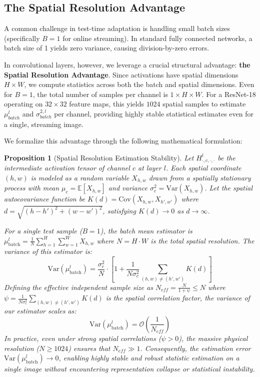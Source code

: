 \documentclass{article}
\theoremstyle{plain}
\newtheorem{proposition}[theorem]{Proposition}
\theoremstyle{definition}
\theoremstyle{remark}
\begin{document}
\subsection{The Spatial Resolution Advantage}
A common challenge in test-time adaptation is handling small batch sizes (specifically $B=1$ for online streaming). In standard fully connected networks, a batch size of 1 yields zero variance, causing division-by-zero errors.

In convolutional layers, however, we leverage a crucial structural advantage: \textbf{the Spatial Resolution Advantage}. Since activations have spatial dimensions $H \times W$, we compute statistics across both the batch and spatial dimensions. Even for $B=1$, the total number of samples per channel is $1 \times H \times W$. For a ResNet-18 operating on $32 \times 32$ feature maps, this yields $1024$ spatial samples to estimate $\mu^l_{batch}$ and $\sigma^{2,l}_{batch}$ per channel, providing highly stable statistical estimates even for a single, streaming image.

We formalize this advantage through the following mathematical formulation:
\begin{proposition}[Spatial Resolution Estimation Stability]
Let $H^l_{\cdot, c, \cdot, \cdot}$ be the intermediate activation tensor of channel $c$ at layer $l$. Each spatial coordinate $(h, w)$ is modeled as a random variable $X_{h,w}$ drawn from a spatially stationary process with mean $\mu_c = \mathbb{E}[X_{h,w}]$ and variance $\sigma^2_c = \text{Var}(X_{h,w})$. Let the spatial autocovariance function be $K(d) = \text{Cov}(X_{h,w}, X_{h',w'})$ where $d = \sqrt{(h-h')^2 + (w-w')^2}$, satisfying $K(d) \to 0$ as $d \to \infty$. 

For a single test sample ($B=1$), the batch mean estimator is $\mu^l_{\text{batch}} = \frac{1}{N} \sum_{h=1}^H \sum_{w=1}^W X_{h,w}$ where $N = H \cdot W$ is the total spatial resolution. The variance of this estimator is:
\begin{equation}
  \text{Var}(\mu^l_{\text{batch}}) = \frac{\sigma^2_c}{N} \cdot \left[ 1 + \frac{1}{N \sigma^2_c} \sum_{(h,w) \neq (h',w')} K(d) \right]
\end{equation}
Defining the effective independent sample size as $N_{eff} = \frac{N}{1 + \psi} \le N$ where $\psi = \frac{1}{N \sigma^2_c} \sum_{(h,w) \neq (h',w')} K(d)$ is the spatial correlation factor, the variance of our estimator scales as:
\begin{equation}
  \text{Var}(\mu^l_{\text{batch}}) = \mathcal{O}\left(\frac{1}{N_{eff}}\right)
\end{equation}
In practice, even under strong spatial correlations ($\psi > 0$), the massive physical resolution ($N \ge 1024$) ensures that $N_{eff} \gg 1$. Consequently, the estimation error $\text{Var}(\mu^l_{\text{batch}}) \to 0$, enabling highly stable and robust statistic estimation on a single image without encountering representation collapse or statistical instability.
\end{proposition}
\end{document}
